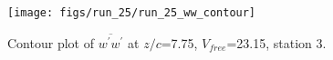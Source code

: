 \begin{figure}[H]
\centering
\texttt{[image: figs/run\_25/run\_25\_ww\_contour]}
\caption{Contour plot of $\overline{w^\prime w^\prime}$ at $z/c$=7.75, $V_{free}$=23.15, station 3.}
\label{fig:run_25_ww_contour}
\end{figure}


